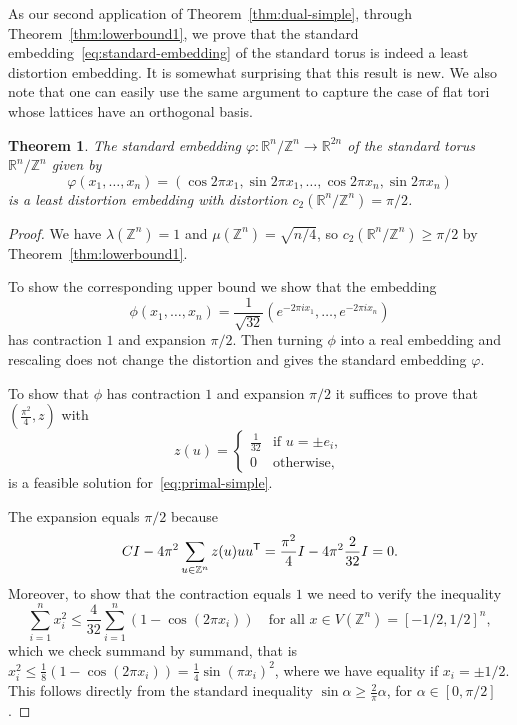 \documentclass{amsart}
\newtheorem{theorem}[defin]{Theorem}
\newcommand{\R}{\mathbb{R}}
\newcommand{\Z}{\mathbb{Z}}
\begin{document}
 As our second application of Theorem~\ref{thm:dual-simple}, through
 Theorem~\ref{thm:lowerbound1}, we prove that the standard
 embedding~\eqref{eq:standard-embedding} of the standard torus is
 indeed a least distortion embedding. It is somewhat surprising that
 this result is new. We also note that one can easily use the same
 argument to capture the case of flat tori whose lattices have an
 orthogonal basis.

 \begin{theorem}\label{thm:standard-torus-embedding}
   The standard embedding $\varphi : \R^n / \Z^n \to \R^{2n}$ of the
   standard torus $\R^n / \Z^n$ given by
   \[
  \varphi(x_1, \ldots, x_n) = (\cos 2\pi x_1, \sin 2\pi x_1, \ldots,
  \cos 2\pi x_n, \sin 2\pi x_n)
\]
is a least distortion embedding with distortion $c_2(\R^n/\Z^n) = \pi/2$.
\end{theorem}

\begin{proof}
  We have $\lambda(\Z^n) = 1$ and $\mu(\Z^n) = \sqrt{n/4}$, so
  $c_2(\R^n / \Z^n) \geq \pi/2$ by Theorem~\ref{thm:lowerbound1}.

  To show the corresponding upper bound we show that the embedding
  \[
    \phi(x_1, \ldots, x_n) =\frac{1}{\sqrt{32}}  ( e^{-2\pi
      ix_1},\ldots, e^{-2\pi ix_n})
  \]
  has contraction $1$ and expansion $\pi/2$. Then turning $\phi$ into a
  real embedding and rescaling does not change the distortion and
  gives the standard embedding $\varphi$.

  To show that $\phi$ has contraction $1$ and expansion $\pi/2$ it
  suffices to prove that $(\frac{\pi^2}{4},z)$ with
\[
   z(u) = \begin{cases}
    \frac{1}{32} & \text{if } u= \pm e_i,\\
    0 & \text{otherwise},
    \end{cases}
\]
is a feasible solution for~\eqref{eq:primal-simple}.

The expansion equals $\pi/2$ because
\[
  C I - 4 \pi^2 \sum_{u \in \Z^n} z(u) uu^{\sf T} = \frac{\pi^2}{4} I -
  4 \pi^2 \frac{2}{32} I = 0.
\]
Moreover, to show that the contraction equals $1$ we need to verify
the inequality
\begin{equation}
\label{eq:heart-inequality}
    \sum_{i=1}^n x_i^2 \leq \frac{4}{32} \sum_{i=1}^n (1-\cos(2\pi x_i)) \quad \text{for all } x \in V(\Z^n) = [-1/2,1/2]^n,
\end{equation}
which we check summand by summand, that is
$x_i^2 \leq \frac{1}{8} (1 - \cos(2\pi x_i)) = \frac{1}{4} \sin(\pi x_i)^2$, where we have equality
if $x_i = \pm 1/2$. This follows directly from the standard inequality $\sin \alpha \geq \frac{2}{\pi} \alpha$, for $\alpha \in [0,\pi/2]$. 
\end{proof}
\end{document}
